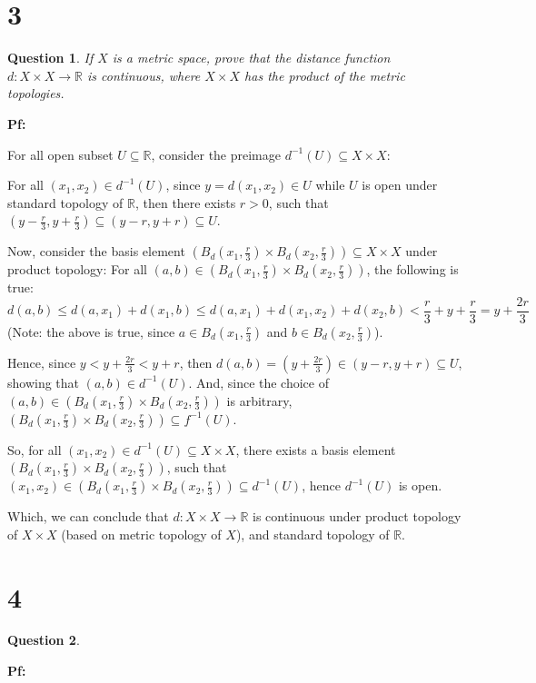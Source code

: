 \documentclass{article}
\newtheorem{question}{Question}
\begin{document}
\break

\section*{3}
\begin{myBox}[]{}
    \begin{question}
        If $X$ is a metric space, prove that the distance function $d:X\times X\rightarrow \mathbb{R}$ is
        continuous, where $X\times X$ has the product of the metric topologies.
    \end{question}
\end{myBox}

\textbf{Pf:}

For all open subset $U\subseteq \mathbb{R}$, consider the preimage $d^{-1}(U)\subseteq X\times X$:

For all $(x_1,x_2)\in d^{-1}(U)$, since $y=d(x_1,x_2)\in U$ while $U$ is open under standard topology of $\mathbb{R}$, 
then there exists $r>0$, such that $(y-\frac{r}{3},y+\frac{r}{3})\subseteq (y-r,y+r) \subseteq U$.

\hfill

Now, consider the basis element $\left(B_d(x_1,\frac{r}{3})\times B_d(x_2,\frac{r}{3})\right)\subseteq X\times X$ under product topology:
For all $(a,b)\in \left(B_d(x_1,\frac{r}{3})\times B_d(x_2,\frac{r}{3})\right)$, the following is true:
$$d(a,b) \leq d(a,x_1) + d(x_1,b) \leq d(a,x_1)+d(x_1,x_2)+d(x_2,b) < \frac{r}{3}+y+\frac{r}{3} = y+\frac{2r}{3}$$
(Note: the above is true, since $a\in B_d(x_1,\frac{r}{3})$ and $b\in B_d(x_2,\frac{r}{3})$).

Hence, since $y<y+\frac{2r}{3} < y+r$, then $d(a,b)=(y+\frac{2r}{3}) \in (y-r,y+r)\subseteq U$, showing that $(a,b)\in d^{-1}(U)$.
And, since the choice of $(a,b)\in \left(B_d(x_1,\frac{r}{3})\times B_d(x_2,\frac{r}{3})\right)$ is arbitrary, $\left(B_d(x_1,\frac{r}{3})\times B_d(x_2,\frac{r}{3})\right) \subseteq f^{-1}(U)$.

\hfill

So, for all $(x_1,x_2) \in d^{-1}(U) \subseteq X\times X$, there exists a basis element $\left(B_d(x_1,\frac{r}{3})\times B_d(x_2,\frac{r}{3})\right)$, 
such that $(x_1,x_2)\in \left(B_d(x_1,\frac{r}{3})\times B_d(x_2,\frac{r}{3})\right)\subseteq d^{-1}(U)$,
hence $d^{-1}(U)$ is open.

Which, we can conclude that $d:X\times X\rightarrow \mathbb{R}$ is continuous under product topology of $X\times X$ (based on metric topology of $X$), and standard topology of $\mathbb{R}$.

\break

\section*{4}
\begin{myBox}[]{}
    \begin{question}
        
    \end{question}
\end{myBox}

\textbf{Pf:}
\end{document}
